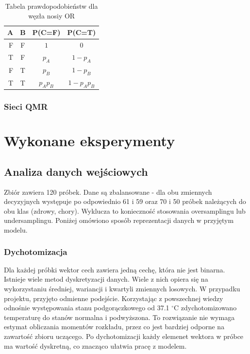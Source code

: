 \documentclass{article}
\begin{document}
\begin{table}
\caption{Tabela prawdopodobieństw dla węzła nosiy OR}
\label{nosiy OR}
\centering
\begin{tabular}{|r|c|c|c|}
  \hline 
  A & B & P(C=F) & P(C=T)\\
  \hline
  F & F & $1$ & $0$\\
  \hline
  T & F & $p_A$ & $1-p_A$ \\
  \hline
  F & T & $p_B$ & $1-p_B$ \\
  \hline
  T & T & $p_A p_B$ & $1 - p_A p_B$ \\
  \hline
\end{tabular}
\end{table} 

\subsubsection{Sieci QMR}

\section{Wykonane eksperymenty}

\subsection{Analiza danych wejściowych}

Zbiór zawiera 120 próbek. Dane są zbalansowane - dla obu zmiennych decyzyjnych występuje po odpowiednio 61 i 59 oraz 70 i 50 próbek należących do obu klas (zdrowy, chory). Wyklucza to konieczność stosowania oversamplingu lub undersamplingu. Poniżej omówiono sposób reprezentacji danych w przyjętym modelu.

\subsubsection{Dychotomizacja}
Dla każdej próbki wektor cech zawiera jedną cechę, która nie jest binarna. Istnieje wiele metod dyskretyzacji danych. Wiele z nich opiera się na wykorzystaniu średniej, wariancji i kwartyli zmiennych losowych. W przypadku projektu, przyjęto odmienne podejście. Korzystając z powszechnej wiedzy odnośnie występowania stanu podgorączkowego od 37.1 $^{\circ}$C zdychotomizowano temperaturę do stanów normalna i podwyższona. To rozwiązanie nie wymaga estymat obliczania momentów rozkładu, przez co jest bardziej odporne na zawartość zbioru uczącego. Po dychotomizacji każdy elemenet wektora w próbce ma wartość dyskretną, co znacząco ułatwia pracę z modelem.
\end{document}
